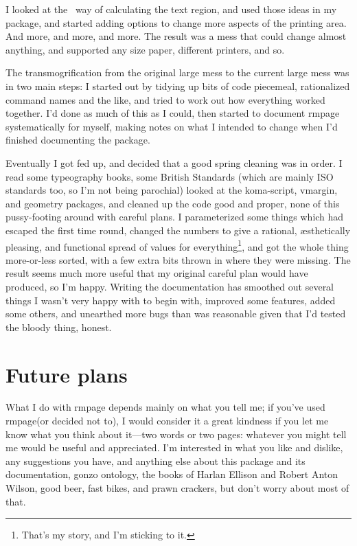\documentclass[11pt,loose,twoside,touchwider,longish,
                      noheaders,a4paper,notstdmargins]{report}
\newcommand*{\packname}[1]{{\sffamily #1}}
\newcommand*{\classname}[1]{{\ttfamily #1}}
\newcommand*{\rmpage}{\classname{rmpage}\xspace}
\begin{document}
I looked at the \LaTeXe\ way of calculating the text region, and used
those ideas in my package, and started adding options to change more
aspects of the printing area.  And more, and more, and more.  The
result was a mess that could change almost anything, and supported any
size paper, different printers, and so.

The transmogrification from the original large mess to the current
large mess was in two main steps: I started out by tidying up bits of
code piecemeal, rationalized command names and the like, and tried to
work out how everything worked together.  I'd done as much of this as
I could, then started to document \rmpage systematically for myself,
making notes on what I intended to change when I'd finished
documenting the package.

Eventually I got fed up, and decided that a good spring cleaning was
in order.  I read some typeography books, some British Standards
(which are mainly ISO standards too, so I'm not being parochial)
looked at the \packname{koma-script}, \packname{vmargin}, and
\packname{geometry} packages, and cleaned up the code good and proper,
none of this pussy-footing around with careful plans.  I parameterized
some things which had escaped the first time round, changed the
numbers to give a rational, \ae sthetically pleasing, and functional
spread of values for everything\footnote{That's my story, and I'm
sticking to it.}, and got the whole thing more-or-less sorted, with a
few extra bits thrown in where they were missing.  The result seems
much more useful that my original careful plan would have produced, so
I'm happy.  Writing the documentation has smoothed out several things
I wasn't very happy with to begin with, improved some features, added
some others, and unearthed more bugs than was reasonable given that
I'd tested the bloody thing, honest.

\section{Future plans}

What I do with \rmpage depends mainly on what you tell me; if you've
used \rmpage (or decided not to), I would consider it a great kindness
if you let me know what you think about it---two words or two pages:
whatever you might tell me would be useful and appreciated.  I'm
interested in what you like and dislike, any suggestions you have, and
anything else about this package and its documentation, gonzo
ontology, the books of Harlan Ellison and Robert Anton Wilson, good
beer, fast bikes, and prawn crackers, but don't worry about most of
that.
\end{document}
